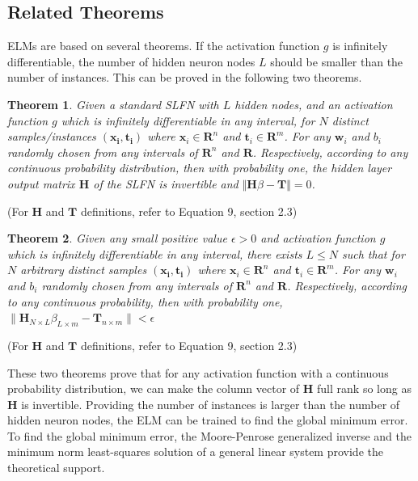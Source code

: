 \documentclass[a4paper, 14pt]{extarticle}
\newtheorem{theorem}{Theorem}
\begin{document}
\subsection{Related Theorems}
ELMs are based on several theorems. If the activation function \(g\) is infinitely differentiable, the number of hidden neuron nodes \(L\) should be smaller than the number of instances. This can be proved in the following two theorems.  
\par 
\begin{theorem}
Given a standard SLFN with \(L\) hidden nodes, and an activation function \(g\) which is infinitely differentiable in any interval, for \(N\) distinct samples/instances \((\mathbf{x_i, t_i})\) where \(\mathbf{x}_i \in \mathbf{R}^n\) and \(\mathbf{t}_i \in \mathbf{R}^m\). For any \(\mathbf{w}_i\) and \(b_i\) randomly chosen from any intervals of \(\mathbf{R}^n\) and \(\mathbf{R}\). Respectively, according to any continuous probability distribution, then with probability one, the hidden layer output matrix \(\mathbf{H}\) of the SLFN is invertible and \(\Vert\mathbf{H}\beta - \mathbf{T}\Vert = 0\)\cite{huang2006extreme}. 
\end{theorem}
(For \(\mathbf{H}\) and \(\mathbf{T}\) definitions, refer to Equation 9, section 2.3)
\begin{theorem}
Given any small positive value \(\epsilon>0\) and activation function \(g\) which is infinitely differentiable in any interval, there exists \(L \leq N \) such that for \(N\) arbitrary distinct samples \((\mathbf{x_i, t_i})\) where \(\mathbf{x}_i \in \mathbf{R}^n\) and \(\mathbf{t}_i \in \mathbf{R}^m\). For any \(\mathbf{w}_i\) and \(b_i\) randomly chosen from any intervals of \(\mathbf{R}^n\) and \(\mathbf{R}\). Respectively, according to any continuous probability, then with probability one, \(\parallel \mathbf{H}_{N \times L}\beta_{L \times m} - \mathbf{T}_{n \times m}\parallel < \epsilon \)\cite{huang2006extreme}
\end{theorem}
(For \(\mathbf{H}\) and \(\mathbf{T}\) definitions, refer to Equation 9, section 2.3)\newline
\par These two theorems prove that for any activation function with a continuous probability distribution, we can make the column vector of \(\mathbf{H}\) full rank so long as \(\mathbf{H}\) is invertible. Providing the number of instances is larger than the number of hidden neuron nodes, the ELM can be trained to find the global minimum error. To find the global minimum error, the Moore-Penrose generalized inverse and the minimum norm least-squares solution of a general linear system provide the theoretical support. 
\end{document}
